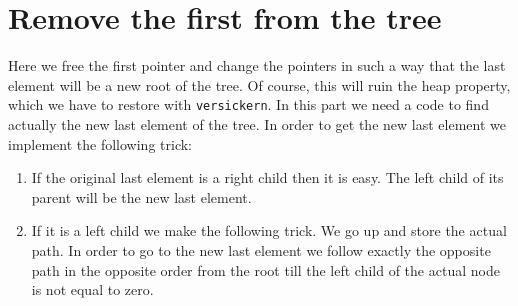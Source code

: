 \documentclass{article}[12pt]
\begin{document}
\section{Remove the first from the tree}
Here we free the first pointer and change the pointers in such a way that
the last element will be a new root of the tree. Of course, this will 
ruin the heap property, which we have to restore with  \texttt{versickern}. 
In this part we need a code to find actually the new last element of the tree. 
In order to get the new last element we implement the following trick:
\begin{enumerate}
\item If the original last element is a right child then it is easy.
The left child of its parent will be the new last element. 
\item If it is a left child we make the following trick.
We go up and store the actual path. In order to go to the new last element
we follow exactly the opposite path in the opposite order from the root till the 
left child of the actual node is not equal to zero.
\end{enumerate}
\end{document}
